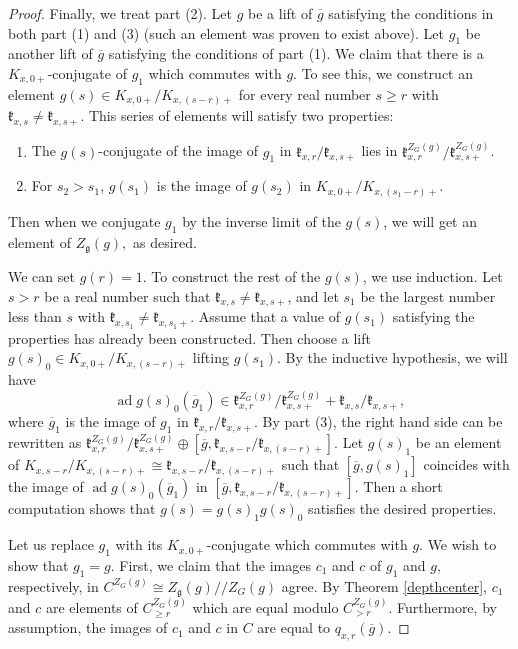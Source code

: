 \documentclass[10pt,a4paper]{amsart}
\newcommand{\on}{\operatorname}
\begin{document}
\begin{proof}
Finally, we treat part (2). Let $g$ be a lift of $\overline{g}$ satisfying the conditions in both part (1) and (3) (such an element was proven to exist above). Let $g_1$ be another lift of $\overline{g}$ satisfying the conditions of part (1). We claim that there is a $K_{x,0+}$-conjugate of $g_1$ which commutes with $g$. To see this, we construct an element $g(s)\in K_{x,0+}/K_{x,(s-r)+}$ for every real number $s\geq r$ with $\mathfrak{k}_{x,s}\neq\mathfrak{k}_{x,s+}$. This series of elements will satisfy two properties:
\begin{enumerate}
\item The $g(s)$-conjugate of the image of $g_1$ in $\mathfrak{k}_{x,r}/\mathfrak{k}_{x,s+}$ lies in $\mathfrak{k}^{Z_G(g)}_{x,r}/\mathfrak{k}^{Z_G(g)}_{x,s+}$.
\item For $s_2>s_1$, $g(s_1)$ is the image of $g(s_2)$ in $K_{x,0+}/K_{x,(s_1-r)+}$.
 \end{enumerate}
 Then when we conjugate $g_1$ by the inverse limit of the $g(s)$, we will get an element of $Z_{\mathfrak{g}}(g),$ as desired.

We can set $g(r)=1$. To construct the rest of the $g(s)$, we use induction. Let $s>r$ be a real number such that $\mathfrak{k}_{x,s}\neq\mathfrak{k}_{x,s+}$, and let $s_1$ be the largest number less than $s$ with $\mathfrak{k}_{x,s_1}\neq\mathfrak{k}_{x,s_1+}$. Assume that a value of $g(s_1)$ satisfying the properties has already been constructed. Then choose a lift $g(s)_0\in K_{x,0+}/K_{x,(s-r)+}$ lifting $g(s_1)$. By the inductive hypothesis, we will have
\[
\on{ad} g(s)_0(\overline{g}_1)\in\mathfrak{k}^{Z_G(g)}_{x,r}/\mathfrak{k}^{Z_G(g)}_{x,s+}+\mathfrak{k}_{x,s}/\mathfrak{k}_{x,s+},
\]
where $\overline{g}_1$ is the image of $g_1$ in $\mathfrak{k}_{x,r}/\mathfrak{k}_{x,s+}$. By part (3), the right hand side can be rewritten as $\mathfrak{k}^{Z_G(g)}_{x,r}/\mathfrak{k}^{Z_G(g)}_{x,s+}\oplus[\overline{g},\mathfrak{k}_{x,s-r}/\mathfrak{k}_{x,(s-r)+}]$. Let $g(s)_1$ be an element of $K_{x,s-r}/K_{x,(s-r)+}\cong\mathfrak{k}_{x,s-r}/\mathfrak{k}_{x,(s-r)+}$ such that $[\overline{g},g(s)_1]$ coincides with the image of $\on{ad} g(s)_0(\overline{g}_1)$ in $[\overline{g},\mathfrak{k}_{x,s-r}/\mathfrak{k}_{x,(s-r)+}]$. Then a short computation shows that $g(s)=g(s)_1g(s)_0$ satisfies the desired properties.

Let us replace $g_1$ with its $K_{x,0+}$-conjugate which commutes with $g$. We wish to show that $g_1=g.$ First, we claim that the images $c_1$ and $c$ of $g_1$ and $g,$ respectively, in $C^{Z_G(g)}\cong Z_{\mathfrak{g}}(g)//Z_G(g)$ agree. By Theorem \ref{depthcenter}, $c_1$ and $c$ are elements of $C^{Z_G(g)}_{\geq r}$ which are equal modulo $C^{Z_G(g)}_{>r}.$ Furthermore, by assumption, the images of $c_1$ and $c$ in $C$ are equal to $q_{x,r}(\overline{g})$.


\end{proof}
\end{document}
